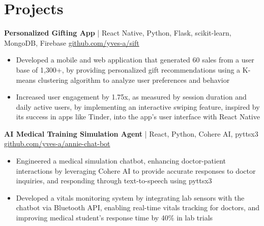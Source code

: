 

\section*{Projects}
\textbf{Personalized Gifting App} | React Native, Python, Flask, scikit-learn, MongoDB, Firebase \hfill \href{https://github.com/yves-a/sift}{github.com/yves-a/sift} \\
\vspace{-5pt}
\begin{itemize}
  \item Developed a mobile and web application that generated 60 sales from a user base of 1,300+, by providing personalized gift recommendations using a K-means clustering algorithm to analyze user preferences and behavior
  \item Increased user engagement by 1.75x, as measured by session duration and daily active users, by implementing an interactive swiping feature, inspired by its success in apps like Tinder, into the app's user interface with React Native
\end{itemize}

\textbf{AI Medical Training Simulation Agent} | React, Python, Cohere AI, pyttsx3  \hfill \href{https://github.com/yves-a/annie-chat-bot}{github.com/yves-a/annie-chat-bot} \\
\vspace{-5pt}
\begin{itemize}
  \item Engineered a medical simulation chatbot, enhancing doctor-patient interactions by leveraging Cohere AI to provide accurate responses to doctor inquiries, and responding through text-to-speech using pyttsx3
  \item Developed a vitals monitoring system by integrating lab sensors with the chatbot via Bluetooth API, enabling real-time vitals tracking for doctors, and improving medical student's response time by 40\% in lab trials
\end{itemize}

